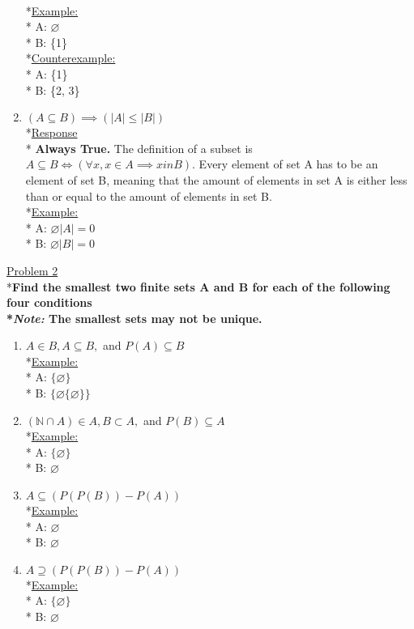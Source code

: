 \documentclass[12pt]{article}
\begin{document}
\begin{enumerate}
\smallskip
\\*\uline{Example:}
\\* A: $\varnothing$ 
\\* B: \{1\}
\smallskip
\\*\uline{Counterexample:}
\\* A: \{1\}\quad
\\* B: \{2, 3\}\quad
\item $(A \subseteq B) \implies (|A| \leq |B|)$
\smallskip
\\*\uline{Response}
\\* \textbf{Always True.} The definition of a subset is $A \subseteq B \iff (\forall x, x \in A \implies x in B).$ Every element of set A has to be an element of set B, meaning that the amount of elements in set A is either less than or equal to the amount of elements in set B.
\smallskip
\\*\uline{Example:}
\\* A: $\varnothing$\quad$|A| = 0$
\\* B: $\varnothing$\quad$|B| = 0$
\smallskip
\end{enumerate}
\medskip
\uline{Problem 2}
\\*\textbf{Find the smallest two finite sets A and B for each of the following four conditions
\\*\textit{Note:} The smallest sets may not be unique.}
\begin{enumerate}
\item $A \in B, A \subseteq B,$ and $P(A) \subseteq B$
\smallskip
\\*\uline{Example:}
\\* A: $\{\varnothing\}$
\\* B: $\{\varnothing \{\varnothing\}\}$
\smallskip
\item $(\mathbb{N} \cap A) \in A, B \subset A,$ and $P(B) \subseteq A$
\smallskip
\\*\uline{Example:}
\\* A: $\{\varnothing\}$
\\* B: $\varnothing$
\smallskip
\item $A \subseteq (P(P(B)) - P(A))$
\smallskip
\\*\uline{Example:}
\\* A: $\varnothing$
\\* B: $\varnothing$
\smallskip
\item $A \supseteq (P(P(B))-P(A))$
\smallskip
\\*\uline{Example:}
\\* A: $\{\varnothing\}$
\\* B: $\varnothing$
\smallskip
\end{enumerate}
\end{document}
